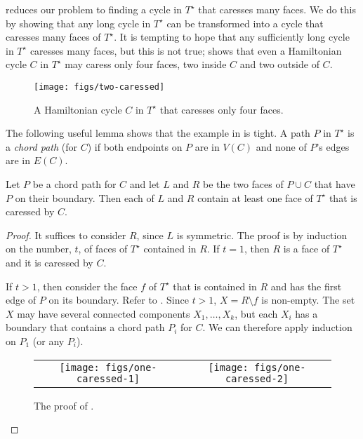 \documentclass{patmorin}
\newcommand{\dual}[1]{{#1}^\star}
\begin{document}
 reduces our problem to finding a cycle in
$\dual{T}$ that caresses many faces.  We do this by showing that any
long cycle in $\dual{T}$ can be transformed into a cycle that caresses
many faces of $\dual{T}$.  It is tempting to hope that any sufficiently
long cycle in $\dual{T}$ caresses many faces, but this is not true;
 shows that even a Hamiltonian cycle $C$ in $\dual{T}$
may caress only four faces, two inside $C$ and two outside of $C$.

\begin{figure}
   \begin{center}
       \texttt{[image: figs/two-caressed]}
   \end{center}
   \caption{A Hamiltonian cycle $C$ in $\dual{T}$ that caresses only four faces.}
\end{figure}

The following useful lemma shows that the example in 
is tight.  A path $P$ in $\dual{T}$ is a \emph{chord path} (for $C$) if
both endpoints on $P$ are in $V(C)$ and none of $P$'s edges are in $E(C)$.

\begin{lem}
   Let $P$ be a chord path for $C$ and let $L$ and $R$ be the two faces
   of $P\cup C$ that have $P$ on their boundary. Then each of $L$ and $R$
   contain at least one face of $\dual{T}$ that is caressed by $C$.
\end{lem}

\begin{proof}
   It suffices to consider $R$, since $L$ is symmetric.  The proof is by
   induction on the number, $t$, of faces of $\dual{T}$ contained in $R$.
   If $t=1$, then $R$ is a face of $\dual{T}$ and it is caressed by $C$.

   If $t>1$, then consider the face $f$ of $\dual{T}$ that is contained
	in $R$ and has the first edge of $P$ on its boundary.  Refer to . Since $t>1$,
   $X=R\setminus f$ is non-empty. The set $X$ may have several connected
   components $X_1,\ldots,X_k$, but each $X_i$ has a boundary that contains a chord path $P_i$ for $C$.
	We can therefore apply induction on $P_1$ (or any $P_i$).
  \begin{figure}
     \begin{center}
	\begin{tabular}{cc}
		\texttt{[image: figs/one-caressed-1]} &
		\texttt{[image: figs/one-caressed-2]}
	\end{tabular}
     \end{center}
	  \caption{The proof of .}
  \end{figure}
\end{proof}
\end{document}
